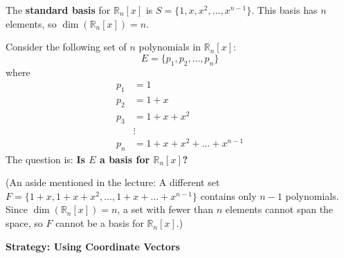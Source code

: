 \documentclass[11pt]{article}
\theoremstyle{definition}
\theoremstyle{remark}
\newcommand{\R}{\mathbb{R}}
\DeclareMathOperator{\dimn}{dim}
\begin{document}
The \textbf{standard basis} for $\R_n[x]$ is $S = \{1, x, x^2, \dots, x^{n-1}\}$. This basis has $n$ elements, so $\dimn(\R_n[x]) = n$.

Consider the following set of $n$ polynomials in $\R_n[x]$:
\[ E = \{p_1, p_2, \dots, p_n\} \]
where
\begin{align*} p_1 &= 1 \\ p_2 &= 1 + x \\ p_3 &= 1 + x + x^2 \\ &\vdots \\ p_n &= 1 + x + x^2 + \dots + x^{n-1} \end{align*}
The question is: \textbf{Is $E$ a basis for $\R_n[x]$?}

(An aside mentioned in the lecture: A different set $F = \{1+x, 1+x+x^2, \dots, 1+x+\dots+x^{n-1}\}$ contains only $n-1$ polynomials. Since $\dimn(\R_n[x])=n$, a set with fewer than $n$ elements cannot span the space, so $F$ cannot be a basis for $\R_n[x]$.)

\textbf{Strategy: Using Coordinate Vectors}
\end{document}
